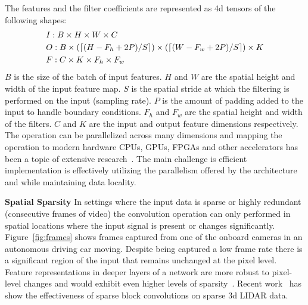 \documentclass{article}
\begin{document}
The features and the filter coefficients are represented as 4d tensors of the
following shapes:
\begin{align*}
& I:B \times H \times W \times C \\
& O:B \times (\lceil (H - F_h + 2P)/S \rceil) \times (\lceil (W - F_w + 2P)/S \rceil) \times K \\
& F:C \times K \times F_h \times F_w
\end{align*}
$B$ is the size of the batch of input features. $H$ and $W$ are the spatial
height and width of the input feature map. $S$ is the spatial stride at which
the filtering is performed on the input (sampling rate). $P$ is the amount of
padding added to the input to handle boundary conditions. $F_h$ and $F_w$ are
the spatial height and width of the filters. $C$ and $K$ are the input and
output feature dimensions respectively. The operation can be parallelized across
many dimensions and mapping the operation to modern hardware CPUs, GPUs, FPGAs
and other accelerators has been a topic of extensive
research~\cite{vasilache2014fast, lavin2016fast, liu2018efficient,
jia2018optimizing, tsai2016performance, truong2016latte, chetlur2014cudnn, chen2017eyeriss}. The main
challenge is efficient implementation is effectively utilizing the parallelism
offered by the architecture and while maintaining data locality.

\textbf{Spatial Sparsity} In settings where the input data is sparse or highly
redundant (consecutive frames of video) the convolution operation can only
performed in spatial locations where the input signal is present or changes
significantly. Figure~\ref{fig:frames} shows frames captured from one of the
onboard cameras in an autonomous driving car moving. Despite being captured a
low frame rate there is a significant region of the input that remains unchanged
at the pixel level. Feature representations in deeper layers of a network are
more robust to pixel-level changes and would exhibit even higher levels of
sparsity~\cite{shelhamer2016clockwork}. Recent work~\cite{ren2018sbnet} has show
the effectiveness of sparse block convolutions on sparse 3d LIDAR data.
\end{document}
